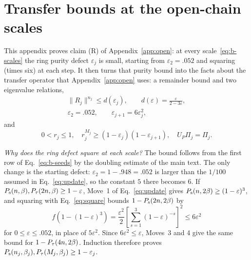 \documentclass[aps,prl,reprint,amsmath,amssymb,nofootinbib,raggedbottom]{revtex4-2}
\begin{document}
\section{Transfer bounds at the open-chain scales}\label{app:b-periodic}
This appendix proves claim (R) of Appendix~\ref{app:open}: at every
scale~\eqref{eq:b-scales} the ring purity defect $\varepsilon_j$ is small,
starting from $\varepsilon_2=.052$ and squaring (times six) at each step. It
then turns that purity bound into the facts about the transfer operator that
Appendix~\ref{app:open} uses: a remainder bound and two eigenvalue relations,
\begin{equation}
 \begin{gathered}
 \|R_j\|^{n_j}\le d(\varepsilon_j),\qquad d(\varepsilon)=\frac{\varepsilon}{2-3\varepsilon},\\
 \varepsilon_2=.052,\qquad \varepsilon_{j+1}=6\varepsilon_j^2,
 \end{gathered}
 \label{eq:b-tail}
\end{equation}
and
\begin{equation}
 0<r_j\le1,\quad r_j^{M_j}\ge(1-\varepsilon_j)(1-\varepsilon_{j+1}),\quad
 U_P\Pi_j=\Pi_j.
 \label{eq:b-ratios}
\end{equation}

\emph{Why does the ring defect square at each scale?} The bound follows from the
first row of Eq.~\eqref{eq:b-seeds} by the doubling estimate of the main text.
The only change is the starting defect: $\varepsilon_2=1-.948=.052$ is larger
than the $1/100$ assumed in Eq.~\eqref{eq:update}, so the constant $5$ there
becomes $6$. If $P_{\mathrm s}(n,\beta),P_{\tau}(2n,\beta)\ge1-\varepsilon$, Move~1 of
Eq.~\eqref{eq:update} gives $P_{\mathrm s}(n,2\beta)\ge(1-\varepsilon)^3$, and squaring
with Eq.~\eqref{eq:square} bounds $1-P_{\mathrm s}(2n,2\beta)$ by
\begin{equation}
 f(1-(1-\varepsilon)^3)=\frac{\varepsilon^2}{2}
 \left[\sum_{s=1}^3(1-\varepsilon)^{-s}\right]^2\le6\varepsilon^2
 \label{eq:b-periodic-six}
\end{equation}
for $0\le\varepsilon\le.052$, in place of $5\varepsilon^2$. Since
$6\varepsilon^2\le\varepsilon$, Moves~3 and 4 give the same bound for
$1-P_{\tau}(4n,2\beta)$. Induction therefore proves
$P_{\mathrm s}(n_j,\beta_j),P_{\tau}(M_j,\beta_j)\ge1-\varepsilon_j$.
\end{document}
